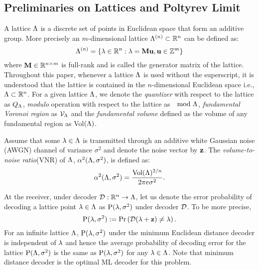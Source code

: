 \documentclass[journal,draftcls,onecolumn,12pt,twoside]{IEEEtran}
\begin{document}
\subsection{Preliminaries on Lattices and Poltyrev Limit}
A lattice $\Lambda$ is a discrete set of points in Euclidean space that form an additive group. More precisely an $m$-dimensional lattice $\Lambda^{(n)}\subset \mathbb{R}^{n}$ can be defined as:
\begin{equation}
\Lambda^{(n)} =\{\lambda\in\mathbb{R}^{n}:\lambda=\mathbf{M}\mathbf{u},\mathbf{u}\in \mathbb{Z}^{m}\}
\end{equation}
where $\mathbf{M}\in\mathbb{R}^{n \times m}$ is full-rank and is called the generator matrix of the lattice. Throughout this paper, whenever a lattice $\Lambda$ is used without the superscript, it is understood that the lattice is contained in the $n$-dimensional Euclidean space i.e., $\Lambda\subset \mathbb{R}^{n}$. For a given lattice $\Lambda$, we denote the \textit{quantizer} with respect to the lattice as $Q_{\Lambda}$,  \textit{modulo} operation with respect to the lattice as $\mod {\Lambda}$,  \textit{fundamental Voronoi region} as $\mathcal{V}_{\Lambda}$ and the \textit{fundamental volume} defined as the volume of any fundamental region as Vol$(\Lambda)$\cite{erez2004achieving}.

Assume that some $\mathbf{\lambda}\in\Lambda$ is transmitted through an additive white Gaussian noise (AWGN) channel of variance $\sigma^{2}$ and denote the noise vector by $\mathbf{z}$. The \textit{volume-to-noise ratio}(VNR) of $\Lambda$, $\alpha^{2}(\Lambda,\sigma^{2})$, is defined as:
\begin{equation}\label{Eqn:VNRDefinition}
\alpha^{2}(\Lambda,\sigma^{2})=\frac{\text{Vol}(\Lambda)^{2/n}}{2\pi e\sigma^{2}}.
\end{equation}

At the receiver, under decoder $\mathcal{D}:\mathbb{R}^{n}\rightarrow\Lambda$, let us denote the error probability of decoding a lattice point $\lambda\in\Lambda$ as $\text{P}(\mathbf{\lambda},\sigma^{2})$ under decoder $\mathcal{D}$. To be more precise,  %
\begin{equation*}
 \text{P}(\mathbf{\lambda},\sigma^{2}):=\Pr\left(\mathcal{D}(\mathbf{\lambda}+\mathbf{z})\neq  \lambda\right).
\end{equation*}
For an infinite lattice $\Lambda$, $\text{P}(\lambda,\sigma^{2})$ under the minimum Euclidean distance decoder is independent of $\lambda$ and hence the average probability of decoding error for the lattice  $\text{P}(\Lambda,\sigma^{2})$ is the same as $\text{P}(\lambda,\sigma^{2})$ for any $\lambda\in \Lambda$. Note that minimum distance decoder is the optimal ML decoder for this problem.
\end{document}
